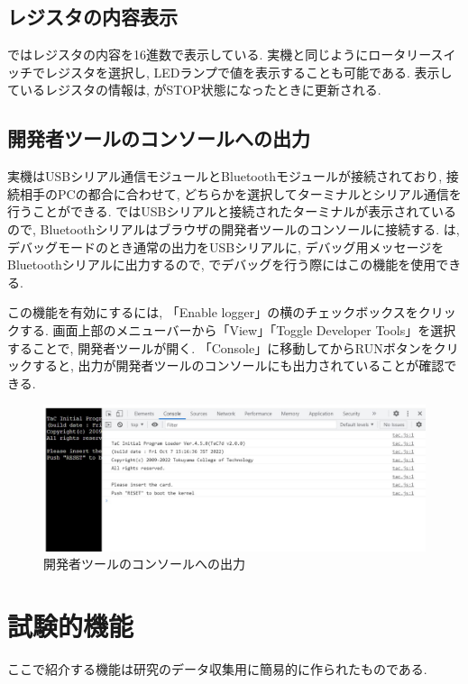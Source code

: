 \subsection{レジスタの内容表示}
\tacsim ではレジスタの内容を16進数で表示している. 実機と同じようにロータリースイッチでレジスタを選択し, LEDランプで値を表示することも可能である. 表示しているレジスタの情報は, \tacsim がSTOP状態になったときに更新される. 

\subsection{開発者ツールのコンソールへの出力}

\tac 実機はUSBシリアル通信モジュールとBluetoothモジュールが接続されており, 接続相手のPCの都合に合わせて, どちらかを選択してターミナルとシリアル通信を行うことができる. \tacsim ではUSBシリアルと接続されたターミナルが表示されているので, Bluetoothシリアルはブラウザの開発者ツールのコンソールに接続する.
\tacos は, デバッグモードのとき通常の出力をUSBシリアルに, デバッグ用メッセージをBluetoothシリアルに出力するので, \tacsim でデバッグを行う際にはこの機能を使用できる.

この機能を有効にするには, 「Enable logger」の横のチェックボックスをクリックする.
画面上部のメニューバーから「View」\rightarrow 「Toggle Developer Tools」を選択することで, 開発者ツールが開く. 「Console」に移動してからRUNボタンをクリックすると, 出力が開発者ツールのコンソールにも出力されていることが確認できる.

\begin{figure}[H]
    \centering
    \includegraphics[width=14cm]{"figs/chapter3-devtools.jpg"}
    \caption{開発者ツールのコンソールへの出力} \label{fig:ch3-devtools}
\end{figure}

\section{試験的機能}

ここで紹介する機能は研究のデータ収集用に簡易的に作られたものである.

